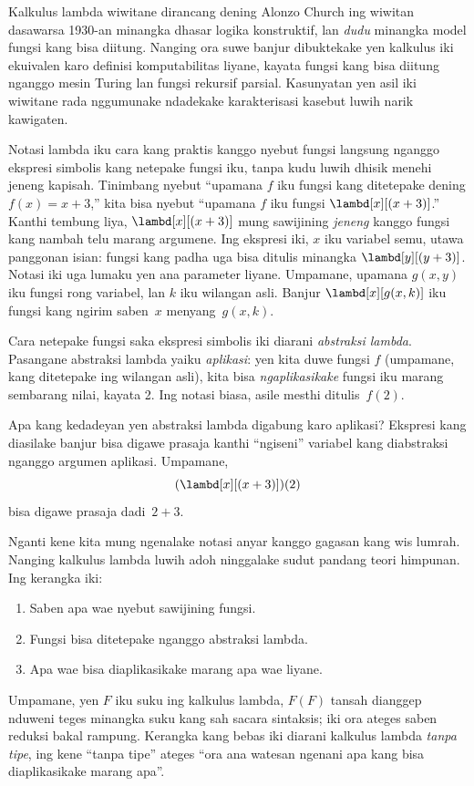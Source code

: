 \documentclass[../../../include/open-logic-section]{subfiles}
\begin{document}

Kalkulus lambda wiwitane dirancang dening Alonzo Church
ing wiwitan dasawarsa 1930-an minangka dhasar logika
konstruktif, lan \emph{dudu} minangka model fungsi
kang bisa diitung. Nanging ora suwe banjur dibuktekake
yen kalkulus iki ekuivalen karo definisi komputabilitas
liyane, kayata fungsi kang bisa diitung nganggo mesin
Turing lan fungsi rekursif parsial. Kasunyatan yen
asil iki wiwitane rada nggumunake ndadekake
karakterisasi kasebut luwih narik kawigaten.

Notasi lambda iku cara kang praktis kanggo nyebut
fungsi langsung nganggo ekspresi simbolis kang
netepake fungsi iku, tanpa kudu luwih dhisik
menehi jeneng kapisah. Tinimbang nyebut
``upamana $f$ iku fungsi kang ditetepake
dening $f(x) = x + 3$,'' kita bisa nyebut
``upamana $f$ iku fungsi
$\lambd[x][(x + 3)]$.'' Kanthi tembung liya,
$\lambd[x][(x+3)]$ mung sawijining \emph{jeneng}
kanggo fungsi kang nambah telu marang argumene.
Ing ekspresi iki, $x$ iku variabel semu,
utawa panggonan isian: fungsi kang padha
uga bisa ditulis minangka $\lambd[y][(y + 3)]$.
Notasi iki uga lumaku yen ana parameter liyane.
Umpamane, upamana $g(x, y)$ iku fungsi rong
variabel, lan $k$ iku wilangan asli. Banjur
$\lambd[x][g(x,k)]$ iku fungsi kang
ngirim saben~$x$ menyang~$g(x, k)$.

Cara netepake fungsi saka ekspresi simbolis iki
diarani \emph{abstraksi lambda}. Pasangane
abstraksi lambda yaiku \emph{aplikasi}:
yen kita duwe fungsi $f$ (umpamane, kang
ditetepake ing wilangan asli), kita bisa
\emph{ngaplikasikake} fungsi iku marang
sembarang nilai, kayata 2. Ing notasi
biasa, asile mesthi ditulis~$f(2)$.

Apa kang kedadeyan yen abstraksi lambda
digabung karo aplikasi? Ekspresi kang
diasilake banjur bisa digawe prasaja
kanthi ``ngiseni'' variabel kang diabstraksi
nganggo argumen aplikasi. Umpamane,
\[
(\lambd[x][(x + 3)])(2)
\]
bisa digawe prasaja dadi~$2 + 3$.

Nganti kene kita mung ngenalake notasi anyar
kanggo gagasan kang wis lumrah. Nanging kalkulus
lambda luwih adoh ninggalake sudut pandang
teori himpunan. Ing kerangka iki:
\begin{enumerate}
\item Saben apa wae nyebut sawijining fungsi.
\item Fungsi bisa ditetepake nganggo abstraksi lambda.
\item Apa wae bisa diaplikasikake marang apa wae liyane.
\end{enumerate}
Umpamane, yen $F$ iku suku ing kalkulus lambda,
$F(F)$ tansah dianggep nduweni teges minangka suku kang sah sacara sintaksis; iki ora ateges saben reduksi bakal rampung.
Kerangka kang bebas iki diarani kalkulus lambda
\emph{tanpa tipe}, ing kene ``tanpa tipe''
ateges ``ora ana watesan ngenani apa kang
bisa diaplikasikake marang apa''.
\end{document}
